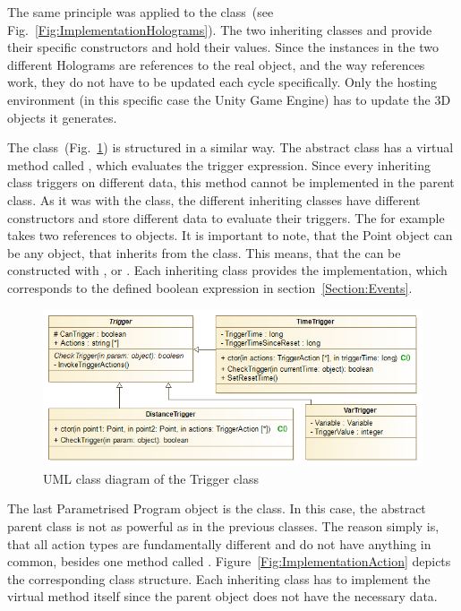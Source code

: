 The same principle was applied to the  class~(see Fig.~\ref{Fig:ImplementationHolograms}). The two inheriting classes  and  provide their specific constructors and hold their values. Since the  instances in the two different Holograms are references to the real  object, and the way references work, they do not have to be updated each cycle specifically. Only the hosting environment (in this specific case the Unity Game Engine) has to update the 3D objects it generates. 

The  class~(Fig.~\ref{Fig:ImplementationTriggers}) is structured in a similar way.  The abstract class  has a virtual method called , which evaluates the trigger expression. Since every inheriting class triggers on different data, this method cannot be implemented in the parent class. As it was with the  class, the different inheriting classes have different constructors and store different data to evaluate their triggers. The  for example takes two references to  objects. It is important to note, that the Point object can be any object, that inherits from the  class. This means, that the  can be constructed with ,  or . Each inheriting class provides the  implementation, which corresponds to the defined boolean expression in section~\ref{Section:Events}.

\begin{figure}[!h]
	\centering
	\includegraphics[width=0.7\linewidth]{Figures/Implementation_Triggers}
	\caption{UML class diagram of the Trigger class}
	\label{Fig:ImplementationTriggers}
\end{figure}

The last Parametrised Program object is the  class. In this case, the abstract parent class is not as powerful as in the previous classes. The reason simply is, that all action types are fundamentally different and do not have anything in common, besides one method called . Figure~\ref{Fig:ImplementationAction} depicts the corresponding class structure. Each inheriting class has to implement the virtual  method itself since the parent object does not have the necessary data.

